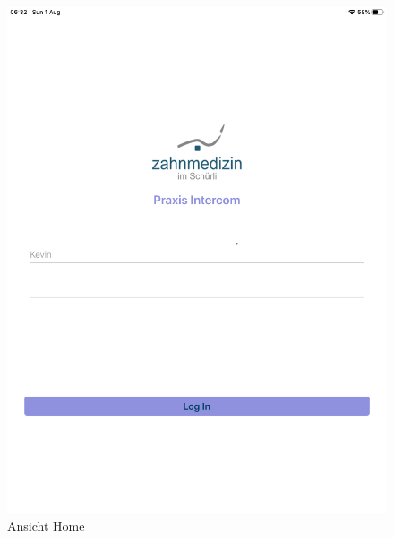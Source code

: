 \begin{figure}[h]
    \centering
    \begin{minipage}[b]{0.4\textwidth}
        \includegraphics[width=\textwidth]{graphics/screenshots/placeholder}
        \caption{Ansicht Home}
    \end{minipage}
    \hfill
    \begin{minipage}[b]{0.4\textwidth}

\end{minipage}
\end{figure}
